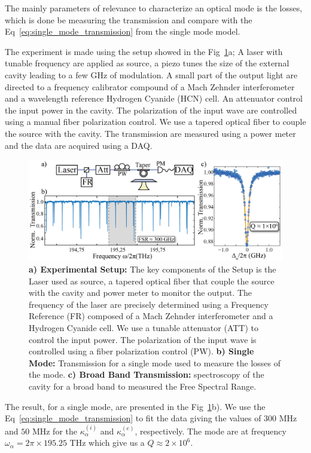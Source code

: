 The mainly parameters of relevance to characterize an optical mode is the losses, which is done be measuring the transmission and compare with the Eq~\ref{eq:single_mode_transmission} from the single mode model. 

The experiment is made using the setup showed in the  Fig~\ref{fig:exp_mode_charac}a; A laser with tunable frequency are applied as source, a piezo tunes the size of the external cavity leading to a few GHz of modulation. A small part of the output light are directed to a frequency calibrator compound of a Mach Zehnder interferometer and a wavelength reference Hydrogen Cyanide (HCN) cell. An attenuator control the input power in the cavity. The polarization of the input wave are controlled using a manual fiber polarization control. We use a tapered optical fiber to couple the source with the cavity. The transmission are measured using a power meter and the data are acquired using a DAQ. 
\begin{figure}[h!]
    \centering
    \includegraphics[width = 16cm]{figuras/Dissertation_optical_char_exp.jpg}
    \caption{\textbf{a) Experimental Setup:} The key components of the Setup is the Laser used as source, a tapered optical fiber that couple the source with the cavity and power meter to monitor the output. The frequency of the laser are precisely determined using a Frequency Reference (FR) composed of a Mach Zehnder interferometer and a Hydrogen Cyanide cell. We use a tunable attenuator (ATT) to control the input power. The polarization of the input wave is controlled using a fiber polarization control (PW). \textbf{b) Single Mode:} Transmission for a single mode used to measure the losses of the mode. \textbf{c) Broad Band Transmission:} spectroscopy of the cavity for a broad band to measured the Free Spectral Range.} 
    \label{fig:exp_mode_charac}
\end{figure}

The result, for a single mode, are presented in the Fig~\ref{fig:exp_mode_charac}b). We use the Eq~\ref{eq:single_mode_transmission} to fit the data giving the values of $300$ MHz and $50$ MHz for the $\kappa_\alpha^{(i)}$ and $\kappa_\alpha^{(e)}$, respectively. The mode are at frequency $\omega_\alpha = 2\pi\times195.25$ THz which give us a $Q \approx 2\times10^6$.

